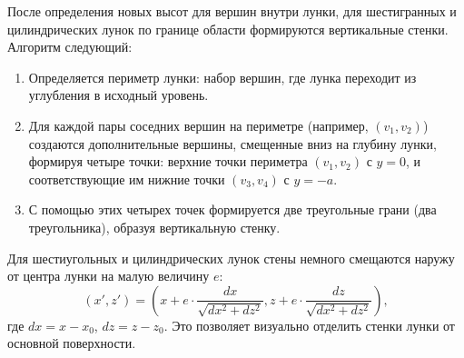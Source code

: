 После определения новых высот для вершин внутри лунки, для шестигранных и цилиндрических лунок по границе области формируются вертикальные стенки. Алгоритм следующий:
\begin{enumerate}
    \item Определяется периметр лунки: набор вершин, где лунка переходит из углубления в исходный уровень.
    \item Для каждой пары соседних вершин на периметре (например, $(v_{\text{1}}, v_{\text{2}})$) создаются дополнительные вершины, смещенные вниз на глубину лунки, формируя четыре точки: верхние точки периметра $(v_{\text{1}}, v_{\text{2}})$ с $y=0$, и соответствующие им нижние точки $(v_{\text{3}}, v_{\text{4}})$ с $y = -a$.
    \item С помощью этих четырех точек формируется две треугольные грани (два треугольника), образуя вертикальную стенку.
\end{enumerate}

Для шестиугольных и цилиндрических лунок стены немного смещаются наружу от центра лунки на малую величину $e$:
\begin{equation}
    (x', z') = (x + e \cdot \frac{dx}{\sqrt{dx^2+dz^2}}, z + e \cdot \frac{dz}{\sqrt{dx^2+dz^2}}),
\end{equation}
где $dx = x - x_0$, $dz = z - z_0$. Это позволяет визуально отделить стенки лунки от основной поверхности.


